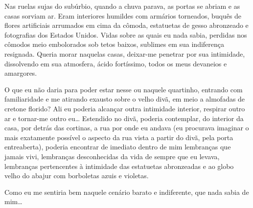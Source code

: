 
Nas ruelas sujas do subúrbio, quando a chuva parava, as portas se abriam e as
casas sorviam ar. Eram interiores humildes com armários torneados, buquês de
flores artificiais arrumados em cima da cômoda, estatuetas de gesso
abronzeado e fotografias dos Estados Unidos. Vidas sobre as quais eu nada
sabia, perdidas nos cômodos meio embolorados sob tetos baixos, sublimes em
sua indiferença resignada. Queria morar naquelas casas, deixar-me penetrar
por sua intimidade, dissolvendo em sua atmosfera, ácido fortíssimo, todos os
meus devaneios e amargores.

O que eu não daria para poder estar nesse ou naquele quartinho, entrando com
familiaridade e me atirando exausto sobre o velho divã, em meio a almofadas
de cretone florido? Ali eu poderia alcançar outra intimidade interior,
respirar outro ar e tornar-me outro eu\ldots{} Estendido no divã, poderia
contemplar, do interior da casa, por detrás das cortinas, a rua por onde eu
andava (eu procurava imaginar o mais exatamente possível o aspecto da rua
vista a partir do divã, pela porta entreaberta), poderia encontrar de
imediato dentro de mim lembranças que jamais vivi, lembranças desconhecidas
da vida de sempre que eu levava, lembranças pertencentes à intimidade das
estatuetas abronzeadas e ao globo velho do abajur com borboletas azuis e
violetas.

Como eu me sentiria bem naquele cenário barato e indiferente, que nada sabia
de mim\ldots{}


